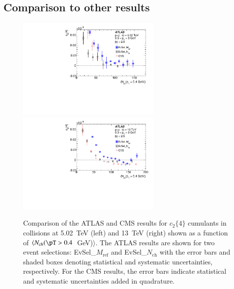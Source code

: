 \documentclass[cernpreprint,texlive=2014,txfonts,UKenglish]{latex/atlasdoc}
\begin{document}
\subsection{Comparison to other results}
\label{sec:comp}
\begin{figure}[t!]
\begin{center}
\includegraphics[width=70mm]{fig_14a.pdf}
\includegraphics[width=70mm]{fig_14b.pdf}
\caption{Comparison of  the ATLAS and CMS \cite{ppcms3} results for $c_2\{4\}$ cumulants in \pp collisions at 5.02~TeV (left) and 13~TeV (right)  shown as a function of $\langle N_{\mathrm{ch}}(\pT > 0.4$~GeV)$\rangle$. The ATLAS results are shown for two event selections: EvSel\_$M_{\mathrm{ref}}$ and EvSel\_$N_{\mathrm{ch}}$ with the error bars and shaded boxes denoting statistical and systematic uncertainties, respectively. For the CMS results, the error bars indicate statistical and systematic uncertainties added in quadrature.}
\label{fig:comp_ppcms} 
\end{center}
\end{figure}
\end{document}
